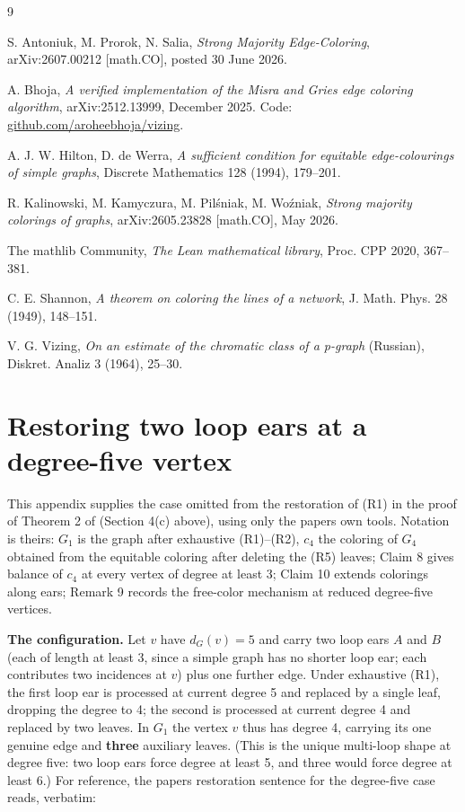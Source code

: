 \documentclass[11pt]{article}
\theoremstyle{definition}
\theoremstyle{remark}
\begin{document}
\begin{thebibliography}{9}

S. Antoniuk, M. Prorok, N. Salia, \emph{Strong Majority Edge-Coloring}, arXiv:2607.00212 [math.CO], posted 30 June 2026.

A. Bhoja, \emph{A verified implementation of the Misra and Gries edge coloring algorithm}, arXiv:2512.13999, December 2025. Code: \url{github.com/aroheebhoja/vizing}.

A. J. W. Hilton, D. de Werra, \emph{A sufficient condition for equitable edge-colourings of simple graphs}, Discrete Mathematics 128 (1994), 179--201.

R. Kalinowski, M. Kamyczura, M. Pilśniak, M. Woźniak, \emph{Strong majority colorings of graphs}, arXiv:2605.23828 [math.CO], May 2026.

The mathlib Community, \emph{The Lean mathematical library}, Proc. CPP 2020, 367--381.

C. E. Shannon, \emph{A theorem on coloring the lines of a network}, J. Math. Phys. 28 (1949), 148--151.

V. G. Vizing, \emph{On an estimate of the chromatic class of a p-graph} (Russian), Diskret. Analiz 3 (1964), 25--30.

\end{thebibliography}
\appendix
\section{Restoring two loop ears at a degree-five vertex}
This appendix supplies the case omitted from the restoration of (R1) in the proof of Theorem 2 of \cite{APS} (Section 4(c) above), using only the paper\textquotesingle s own tools. Notation is theirs: \(G_1\) is the graph after exhaustive (R1)--(R2), \(c_4\) the coloring of \(G_4\) obtained from the equitable coloring after deleting the (R5) leaves; Claim 8 gives balance of \(c_4\) at every vertex of degree at least 3; Claim 10 extends colorings along ears; Remark 9 records the free-color mechanism at reduced degree-five vertices.

\textbf{The configuration.} Let \(v\) have \(d_G(v) = 5\) and carry two loop ears \(A\) and \(B\) (each of length at least 3, since a simple graph has no shorter loop ear; each contributes two incidences at \(v\)) plus one further edge. Under exhaustive (R1), the first loop ear is processed at current degree 5 and replaced by a single leaf, dropping the degree to 4; the second is processed at current degree 4 and replaced by two leaves. In \(G_1\) the vertex \(v\) thus has degree 4, carrying its one genuine edge and \textbf{three} auxiliary leaves. (This is the unique multi-loop shape at degree five: two loop ears force degree at least 5, and three would force degree at least 6.) For reference, the paper\textquotesingle s restoration sentence for the degree-five case reads, verbatim:
\end{document}
